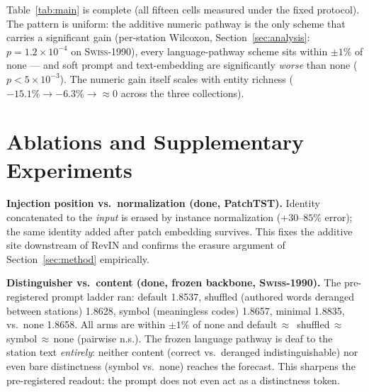 \documentclass[sigconf,review]{acmart}
\newcommand{\swiss}{\textsc{Swiss-1990}}
\begin{document}
Table~\ref{tab:main} is complete (all fifteen cells measured under the fixed
protocol). The pattern is uniform: the additive numeric pathway is the only scheme
that carries a significant gain (per-station Wilcoxon, Section~\ref{sec:analysis}:
$p{=}1.2{\times}10^{-4}$ on \swiss{}), every language-pathway scheme sits within
$\pm1\%$ of \textsf{none} --- and \textsf{soft prompt} and \textsf{text-embedding}
are significantly \emph{worse} than \textsf{none} ($p{<}5{\times}10^{-3}$). The
numeric gain itself scales with entity richness ($-15.1\%\rightarrow-6.3\%%
\rightarrow{\approx}0$ across the three collections).

\section{Ablations and Supplementary Experiments}
\label{sec:ablations}

\textbf{Injection position vs.\ normalization (done, PatchTST).} Identity
concatenated to the \emph{input} is erased by instance normalization ($+30$--$85\%$
error); the same identity added after patch embedding survives. This fixes the
additive site downstream of RevIN and confirms the erasure argument of
Section~\ref{sec:method} empirically.

\textbf{Distinguisher vs.\ content (done, frozen backbone, \swiss{}).} The
pre-registered prompt ladder ran: \textsf{default} 1.8537, \textsf{shuffled}
(authored words deranged between stations) 1.8628, \textsf{symbol} (meaningless
codes) 1.8657, \textsf{minimal} 1.8835, vs.\ \textsf{none} 1.8658. All arms are
within $\pm1\%$ of \textsf{none} and \textsf{default}$\,\approx\,$%
\textsf{shuffled}$\,\approx\,$\textsf{symbol}$\,\approx\,$\textsf{none}
(pairwise n.s.). The frozen language pathway is deaf to the station text
\emph{entirely}: neither content (correct vs.\ deranged indistinguishable) nor
even bare distinctness (\textsf{symbol} vs.\ \textsf{none}) reaches the
forecast. This sharpens the pre-registered readout: the prompt does not even act
as a distinctness token.
\end{document}
